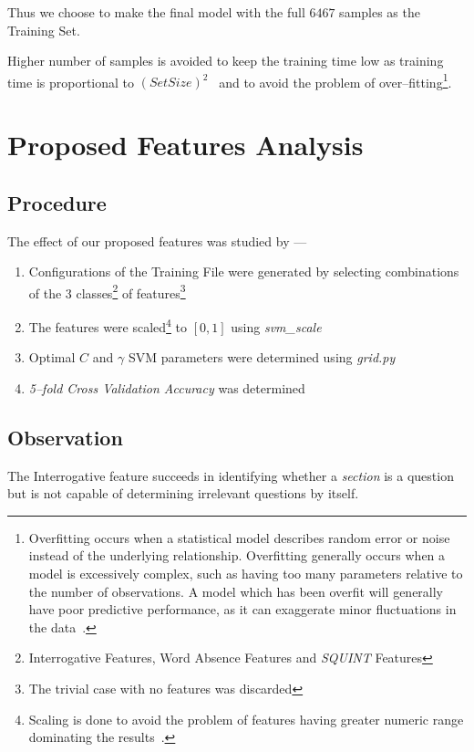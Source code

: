 \documentclass[a4paper,10pt]{report}
\begin{document}
\noindent Thus we choose to make the final model with the full $6467$ samples as the Training Set. 

Higher number of samples is avoided to keep the training time low as training time is proportional to $(SetSize)^2$~\cite{libsvmpaper} and to avoid the problem of over--fitting\footnote{Overfitting occurs when a statistical model describes random error or noise instead of the underlying relationship. Overfitting generally occurs when a model is excessively complex, such as having too many parameters relative to the number of observations. A model which has been overfit will generally have poor predictive performance, as it can exaggerate minor fluctuations in the data~\cite{overfitting}.}.

\section{Proposed Features Analysis}

\subsection{Procedure}

The effect of our proposed features was studied by ---
\begin{enumerate}
    \item Configurations of the Training File were generated by selecting combinations of the 3 classes\footnote{Interrogative Features, Word Absence Features and \emph{SQUINT} Features} of features\footnote{The trivial case with no features was discarded}
    \item The features were scaled\footnote{Scaling is done to avoid the problem of features having greater numeric range dominating the results~\cite{libsvmppt}.} to $[0,1]$ using \emph{svm\_scale}
    \item Optimal $C$ and $\gamma$ SVM parameters were determined using \emph{grid.py}
    \item \emph{5--fold Cross Validation Accuracy} was determined
\end{enumerate}

\subsection{Observation}

The Interrogative feature succeeds in identifying whether a \emph{section} is a question but is not capable of determining irrelevant questions by itself. 
\end{document}
